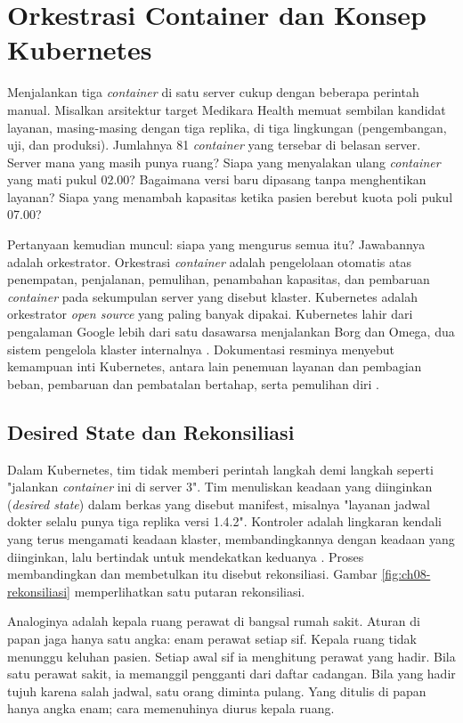 \section{Orkestrasi Container dan Konsep Kubernetes}
\label{sec:ch08-kubernetes}

Menjalankan tiga \textit{container} di satu server cukup dengan beberapa perintah manual. Misalkan
arsitektur target Medikara Health memuat sembilan kandidat layanan, masing-masing dengan tiga
replika, di tiga lingkungan (pengembangan, uji, dan produksi). Jumlahnya 81 \textit{container} yang
tersebar di belasan server. Server mana yang masih punya ruang? Siapa yang menyalakan ulang
\textit{container} yang mati pukul 02.00? Bagaimana versi baru dipasang tanpa menghentikan layanan?
Siapa yang menambah kapasitas ketika pasien berebut kuota poli pukul 07.00?

Pertanyaan kemudian muncul: siapa yang mengurus semua itu? Jawabannya adalah orkestrator.
Orkestrasi \textit{container} adalah pengelolaan otomatis atas penempatan, penjalanan, pemulihan,
penambahan kapasitas, dan pembaruan \textit{container} pada sekumpulan server yang disebut klaster.
Kubernetes adalah orkestrator \textit{open source} yang paling banyak dipakai. Kubernetes lahir dari
pengalaman Google lebih dari satu dasawarsa menjalankan Borg dan Omega, dua sistem pengelola
klaster internalnya \cite{c08-burns2016}. Dokumentasi resminya menyebut kemampuan inti Kubernetes,
antara lain penemuan layanan dan pembagian beban, pembaruan dan pembatalan bertahap, serta pemulihan
diri \cite{c08-k8s-overview}.

\subsection{Desired State dan Rekonsiliasi}

Dalam Kubernetes, tim tidak memberi perintah langkah demi langkah seperti "jalankan
\textit{container} ini di server 3". Tim menuliskan keadaan yang diinginkan (\textit{desired
state}) dalam berkas yang disebut manifest, misalnya "layanan jadwal dokter selalu punya tiga
replika versi 1.4.2". Kontroler adalah lingkaran kendali yang terus mengamati keadaan klaster,
membandingkannya dengan keadaan yang diinginkan, lalu bertindak untuk mendekatkan keduanya
\cite{c08-k8s-controller}. Proses membandingkan dan membetulkan itu disebut rekonsiliasi. Gambar
\ref{fig:ch08-rekonsiliasi} memperlihatkan satu putaran rekonsiliasi.

Analoginya adalah kepala ruang perawat di bangsal rumah sakit. Aturan di papan jaga hanya satu
angka: enam perawat setiap sif. Kepala ruang tidak menunggu keluhan pasien. Setiap awal sif ia
menghitung perawat yang hadir. Bila satu perawat sakit, ia memanggil pengganti dari daftar
cadangan. Bila yang hadir tujuh karena salah jadwal, satu orang diminta pulang. Yang ditulis di
papan hanya angka enam; cara memenuhinya diurus kepala ruang.

